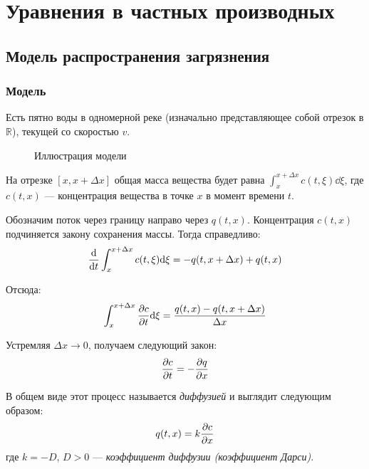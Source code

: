 \clearpage

\section{Уравнения в частных производных}

\subsection{Модель распространения загрязнения}

\subsubsection{Модель}

Есть пятно воды в одномерной реке (изначально представляющее собой отрезок в $\mathbb{R}$), текущей со скоростью $v$.

\begin{figure}[ht]
  \centering
  \caption{Иллюстрация модели}
\end{figure}

На отрезке $[x, x + \Delta x]$ общая масса вещества будет равна $\int_x^{x + \Delta x} c(t, \xi) \dd \xi$, где $c(t, x)$ --- концентрация вещества в точке $x$ в момент времени $t$.

Обозначим поток через границу направо через $q(t, x)$. Концентрация $c(t, x)$ подчиняется закону сохранения массы. Тогда справедливо:
%
\begin{equation}
  \dv{t} \int_x^{x + \Delta x} c(t, \xi) \dd \xi = -q(t, x + \Delta x) + q(t, x)
\end{equation}

Отсюда:
%
\begin{equation}
  \int_{x}^{x + \Delta x} \pdv{c}{t} (t, \xi) \dd \xi = \frac{q(t, x) - q(t, x + \Delta x)}{\Delta x}
\end{equation}

Устремляя $\Delta x \to 0$, получаем следующий закон:
%
\begin{equation}
  \pdv{c}{t} (t, x) = - \pdv{q}{x} (t, x)
\end{equation}

В общем виде этот процесс называется \emph{диффузией} и выглядит следующим образом:
%
\begin{equation}
  q(t, x) = k \pdv{c}{x} (t, x)
\end{equation}
%
где $k = -D$, $D > 0$ --- \emph{коэффициент диффузии (коэффициент Дарси)}.

